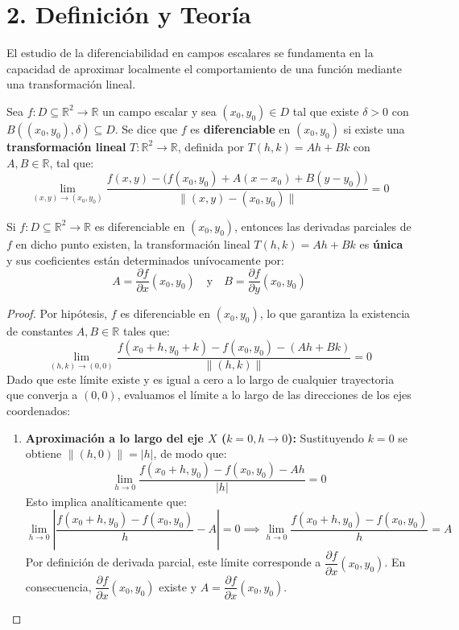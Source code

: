 \documentclass[11pt]{article}
\newenvironment{teoria}{%
  \section*{2. Definición y Teoría}%
}{}
\newenvironment{definicion}[1]{%
  \begin{tcolorbox}[colback=blue!5,colframe=blue!75!black,title=Definición: #1]%
}{%
  \end{tcolorbox}%
}
\newenvironment{teorema}[1]{%
  \begin{tcolorbox}[colback=green!5,colframe=green!75!black,title=Teorema: #1]%
}{%
  \end{tcolorbox}%
}
\begin{document}
\begin{teoria}
  
  El estudio de la diferenciabilidad en campos escalares se fundamenta en la capacidad de aproximar localmente el comportamiento de una función mediante una transformación lineal.

  \begin{definicion}{Diferenciabilidad y Aproximación Lineal}
    Sea $f \colon D \subseteq \mathbb{R}^2 \to \mathbb{R}$ un campo escalar y sea $(x_0, y_0) \in D$ tal que existe $\delta > 0$ con $B((x_0, y_0), \delta) \subseteq D$. Se dice que $f$ es \textbf{diferenciable} en $(x_0, y_0)$ si existe una \textbf{transformación lineal} $T \colon \mathbb{R}^2 \to \mathbb{R}$, definida por $T(h,k) = Ah + Bk$ con $A, B \in \mathbb{R}$, tal que:
    $$ \lim\limits_{(x,y) \to (x_0, y_0)} \dfrac{f(x,y) - \Big( f(x_0, y_0) + A(x-x_0) + B(y-y_0) \Big)}{\| (x,y) - (x_0, y_0) \|} = 0 $$
  \end{definicion}

  \begin{teorema}{Unicidad de la Transformación Lineal y Existencia de Derivadas Parciales}
    Si $f \colon D \subseteq \mathbb{R}^2 \to \mathbb{R}$ es diferenciable en $(x_0, y_0)$, entonces las derivadas parciales de $f$ en dicho punto existen, la transformación lineal $T(h,k) = Ah + Bk$ es \textbf{única} y sus coeficientes están determinados unívocamente por:
    $$ A = \dfrac{\partial f}{\partial x}(x_0, y_0) \quad \text{y} \quad B = \dfrac{\partial f}{\partial y}(x_0, y_0) $$
  \end{teorema}

  \begin{proof}
    Por hipótesis, $f$ es diferenciable en $(x_0, y_0)$, lo que garantiza la existencia de constantes $A, B \in \mathbb{R}$ tales que:
    $$ \lim\limits_{(h,k) \to (0,0)} \dfrac{f(x_0+h, y_0+k) - f(x_0, y_0) - (Ah + Bk)}{\|(h,k)\|} = 0 $$
    Dado que este límite existe y es igual a cero a lo largo de cualquier trayectoria que converja a $(0,0)$, evaluamos el límite a lo largo de las direcciones de los ejes coordenados:

    \begin{enumerate}
      \item \textbf{Aproximación a lo largo del eje $X$ ($k = 0, h \to 0$):}
      Sustituyendo $k = 0$ se obtiene $\|(h,0)\| = |h|$, de modo que:
      $$ \lim\limits_{h \to 0} \dfrac{f(x_0+h, y_0) - f(x_0, y_0) - Ah}{|h|} = 0 $$
      Esto implica analíticamente que:
      $$ \lim\limits_{h \to 0} \left| \dfrac{f(x_0+h, y_0) - f(x_0, y_0)}{h} - A \right| = 0 \implies \lim\limits_{h \to 0} \dfrac{f(x_0+h, y_0) - f(x_0, y_0)}{h} = A $$
      Por definición de derivada parcial, este límite corresponde a $\dfrac{\partial f}{\partial x}(x_0, y_0)$. En consecuencia, $\dfrac{\partial f}{\partial x}(x_0, y_0)$ existe y $A = \dfrac{\partial f}{\partial x}(x_0, y_0)$.


\end{enumerate}
\end{proof}
\end{teoria}
\end{document}
